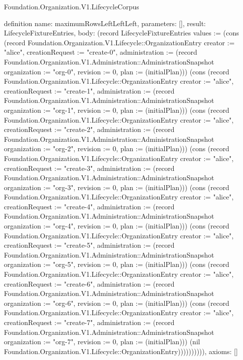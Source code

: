 \begin{lexlean}{Foundation.Organization.V1.LifecycleCorpus}
\begin{semanticmodule}
definition{
  name: maximumRowsLeftLeftLeft,
  parameters: [],
  result: LifecycleFixtureEntries,
  body: (record LifecycleFixtureEntries {values := (cons (record Foundation.Organization.V1.Lifecycle::OrganizationEntry {creator := "alice", creationRequest := "create-0", administration := (record Foundation.Organization.V1.Administration::AdministrationSnapshot {organization := "org-0", revision := 0, plan := (initialPlan)})}) (cons (record Foundation.Organization.V1.Lifecycle::OrganizationEntry {creator := "alice", creationRequest := "create-1", administration := (record Foundation.Organization.V1.Administration::AdministrationSnapshot {organization := "org-1", revision := 0, plan := (initialPlan)})}) (cons (record Foundation.Organization.V1.Lifecycle::OrganizationEntry {creator := "alice", creationRequest := "create-2", administration := (record Foundation.Organization.V1.Administration::AdministrationSnapshot {organization := "org-2", revision := 0, plan := (initialPlan)})}) (cons (record Foundation.Organization.V1.Lifecycle::OrganizationEntry {creator := "alice", creationRequest := "create-3", administration := (record Foundation.Organization.V1.Administration::AdministrationSnapshot {organization := "org-3", revision := 0, plan := (initialPlan)})}) (cons (record Foundation.Organization.V1.Lifecycle::OrganizationEntry {creator := "alice", creationRequest := "create-4", administration := (record Foundation.Organization.V1.Administration::AdministrationSnapshot {organization := "org-4", revision := 0, plan := (initialPlan)})}) (cons (record Foundation.Organization.V1.Lifecycle::OrganizationEntry {creator := "alice", creationRequest := "create-5", administration := (record Foundation.Organization.V1.Administration::AdministrationSnapshot {organization := "org-5", revision := 0, plan := (initialPlan)})}) (cons (record Foundation.Organization.V1.Lifecycle::OrganizationEntry {creator := "alice", creationRequest := "create-6", administration := (record Foundation.Organization.V1.Administration::AdministrationSnapshot {organization := "org-6", revision := 0, plan := (initialPlan)})}) (cons (record Foundation.Organization.V1.Lifecycle::OrganizationEntry {creator := "alice", creationRequest := "create-7", administration := (record Foundation.Organization.V1.Administration::AdministrationSnapshot {organization := "org-7", revision := 0, plan := (initialPlan)})}) (nil Foundation.Organization.V1.Lifecycle::OrganizationEntry)))))))))}),
  axioms: []
}


\end{semanticmodule}
\end{lexlean}
